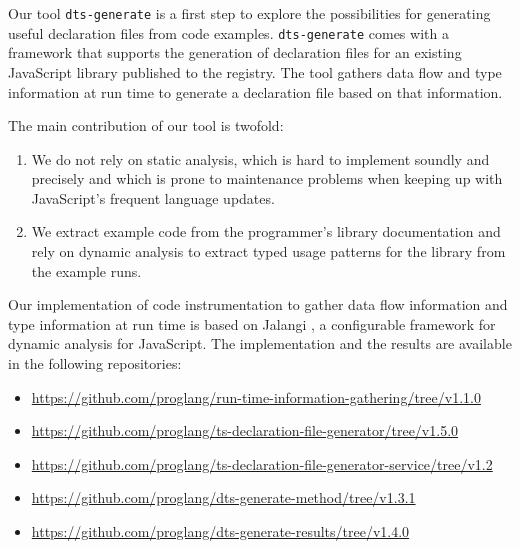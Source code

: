 \documentclass[sigconf]{acmart}
\begin{document}
Our tool \texttt{dts-generate} is a first step to explore the possibilities for
generating useful declaration files from code
examples. \texttt{dts-generate} comes with a framework that 
supports the generation of declaration files for an existing
JavaScript library published to the \NPM{} registry. The tool gathers
data flow and type information at run time to generate a declaration
file based on that information.

The main contribution of our tool is twofold:
\begin{enumerate}
\item
  We do not rely on static analysis, which is hard to implement
  soundly and precisely and which is prone to maintenance problems
  when keeping up with JavaScript's frequent language updates.
\item
  We extract example code from the programmer's library
  documentation and rely on dynamic analysis to extract typed usage
  patterns for the library from the example runs.
\end{enumerate}


Our implementation of code instrumentation  to gather data flow
information and type information at run time is based on
Jalangi \cite{DBLP:conf/sigsoft/SenKBG13}, a configurable
framework for dynamic analysis for JavaScript.
The implementation and the results are available in the following repositories:

\begin{itemize}\footnotesize
  \item \url{https://github.com/proglang/run-time-information-gathering/tree/v1.1.0}
  \item \url{https://github.com/proglang/ts-declaration-file-generator/tree/v1.5.0}
  \item \url{https://github.com/proglang/ts-declaration-file-generator-service/tree/v1.2}
  \item \url{https://github.com/proglang/dts-generate-method/tree/v1.3.1}
  \item \url{https://github.com/proglang/dts-generate-results/tree/v1.4.0}
\end{itemize}
\end{document}
